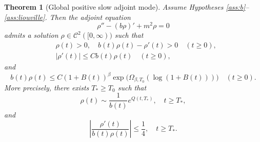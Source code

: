 \documentclass[11pt,reqno]{amsart}
\newtheorem{theorem}{Theorem}
\theoremstyle{definition}
\theoremstyle{remark}
\begin{document}
	\begin{theorem}[Global positive slow adjoint mode]
		\label{thm:rho}
		Assume Hypotheses \ref{ass:b}--\ref{ass:liouville}. Then the adjoint equation
		\begin{equation}
			\label{eq:adjoint}
			\rho''-(b\rho)'+m^2\rho=0
		\end{equation}
		admits a solution $\rho\in \mathcal{C}^2([0,\infty))$ such that
		\begin{align}
			\label{eq:rho-sign}
			&\rho(t)>0,
			\quad
			b(t)\rho(t)-\rho'(t)>0
			\quad(t\geq0), \\
			\label{eq:rho-der}
			&|\rho'(t)|\leq Cb(t)\rho(t)
			\quad(t\geq0),
		\end{align}
		and
		\begin{equation}
			\label{eq:rho-growth}
			b(t)\rho(t)
			\leq C(1+B(t))^\beta
			\exp\bigl(\Omega_{\beta,T_0}(\log(1+B(t)))\bigr)
			\quad(t\geq0).
		\end{equation}
		More precisely, there exists $T_*\geq T_0$ such that
		$$
		\rho(t)\sim\frac{1}{b(t)}e^{Q(t,T_*)},
		\quad t\geq T_*,
		$$
		and
		\begin{equation}
			\label{eq:rho-small-der}
			\left|\frac{\rho'(t)}{b(t)\rho(t)}\right|\leq\frac14,
			\quad t\geq T_*.
		\end{equation}
	\end{theorem}
	
\end{document}
